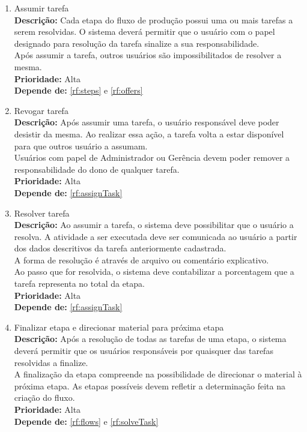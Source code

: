 \begin{enumerate}[label=\textbf{RF\protect\twodigits{\theenumi}}, leftmargin=2cm]
	\item \label{rf:assignTask} Assumir tarefa \\ 
		\textbf{Descrição:} Cada etapa do fluxo de produção possui uma ou mais tarefas a serem resolvidas. O sistema deverá permitir que o usuário com o papel designado para resolução da tarefa sinalize a sua responsabilidade. \\
		Após assumir a tarefa, outros usuários são impossibilitados de resolver a mesma. \\
		\textbf{Prioridade:} Alta \\
		\textbf{Depende de:} \hyperref[rf:steps]{\ref{rf:steps}} e \hyperref[rf:offers]{\ref{rf:offers}}

	\item \label{rf:unassignTask} Revogar tarefa \\ 
		\textbf{Descrição:} Após assumir uma tarefa, o usuário responsável deve poder desistir da mesma. Ao realizar essa ação, a tarefa volta a estar disponível para que outros usuário a assumam. \\
		Usuários com papel de Administrador ou Gerência devem poder remover a responsabilidade do dono de qualquer tarefa. \\
		\textbf{Prioridade:} Alta \\
		\textbf{Depende de:} \hyperref[rf:assignTask]{\ref{rf:assignTask}}

	\item \label{rf:solveTask} Resolver tarefa \\ 
		\textbf{Descrição:} Ao assumir a tarefa, o sistema deve possibilitar que o usuário a resolva. A atividade a ser executada deve ser comunicada ao usuário a partir dos dados descritivos da tarefa anteriormente cadastrada. \\
		A forma de resolução é através de arquivo ou comentário explicativo. \\
		Ao passo que for resolvida, o sistema deve contabilizar a porcentagem que a tarefa representa no total da etapa. \\
		\textbf{Prioridade:} Alta \\
		\textbf{Depende de:} \hyperref[rf:assignTask]{\ref{rf:assignTask}}

	\item \label{rf:endStep} Finalizar etapa e direcionar material para próxima etapa \\
		\textbf{Descrição:} Após a resolução de todas as tarefas de uma etapa, o sistema deverá permitir que os usuários responsáveis por quaisquer das tarefas resolvidas a finalize. \\
		A finalização da etapa compreende na possibilidade de direcionar o material à próxima etapa. As etapas possíveis devem refletir a determinação feita na criação do fluxo. \\
		\textbf{Prioridade:} Alta \\
		\textbf{Depende de:} \hyperref[rf:flows]{\ref{rf:flows}} e \hyperref[rf:solveTask]{\ref{rf:solveTask}}


\end{enumerate}

